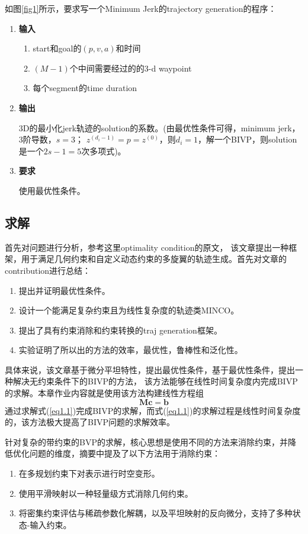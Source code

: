\documentclass[40pt,a4paper,UTF8,twocolumn]{ctexart}%
\numberwithin{equation}{section}
\begin{document}
如图\ref{fig1}所示，要求写一个Minimum Jerk的trajectory generation的程序：
\begin{enumerate}
    \item \textbf{输入}
        \begin{enumerate}
            \item start和goal的$(p,v,a)$和时间
            \item $(M-1)$个中间需要经过的的3-d waypoint
            \item 每个segment的time duration
        \end{enumerate}
    \item \textbf{输出}
    
         3\-D的最小化jerk轨迹的solution的系数。(由最优性条件可得，minimum jerk，3阶导数，$s=3$；
         $z^{(d_i-1)}=p=z^{(0)}$，则$d_i=1$，解一个BIVP，则solution是一个$2s-1=5$次多项式)。
    \item \textbf{要求}

        使用最优性条件。
\end{enumerate}

\subsection{求解}
    首先对问题进行分析，参考这里optimality condition的原文\cite{ref1}，
    该文章提出一种框架，用于满足几何约束和自定义动态约束的多旋翼的轨迹生成。首先对文章的contribution进行总结：
    
    \begin{enumerate}
        \item 提出并证明最优性条件。
        \item 设计一个能满足复杂约束且为线性复杂度的轨迹类MINCO。
        \item 提出了具有约束消除和约束转换的traj generation框架。
        \item 实验证明了所以出的方法的效率，最优性，鲁棒性和泛化性。
    \end{enumerate}
    具体来说，该文章基于微分平坦特性，提出最优性条件，基于最优性条件，提出一种解决无约束条件下的BIVP的方法，
    该方法能够在线性时间复杂度内完成BIVP的求解。本章作业内容就是使用该方法构建线性方程组
    \begin{equation}
        \bm{Mc}=\bm{b}
        \label{eq1.1} %
    \end{equation}
    通过求解式(\ref{eq1.1})完成BIVP的求解，而式(\ref{eq1.1})的求解过程是线性时间复杂度的，该方法极大提高了BIVP问题的求解效率。

    针对复杂的带约束的BVP的求解，核心思想是使用不同的方法来消除约束，并降低优化问题的维度，摘要中提及了以下方法用于消除约束：
    \begin{enumerate}
        \item     在多规划约束下对表示进行时空变形。
        \item     使用平滑映射以一种轻量级方式消除几何约束。
        \item    将密集约束评估与稀疏参数化解耦，以及平坦映射的反向微分，支持了多种状态-输入约束。
    \end{enumerate}
\end{document}

